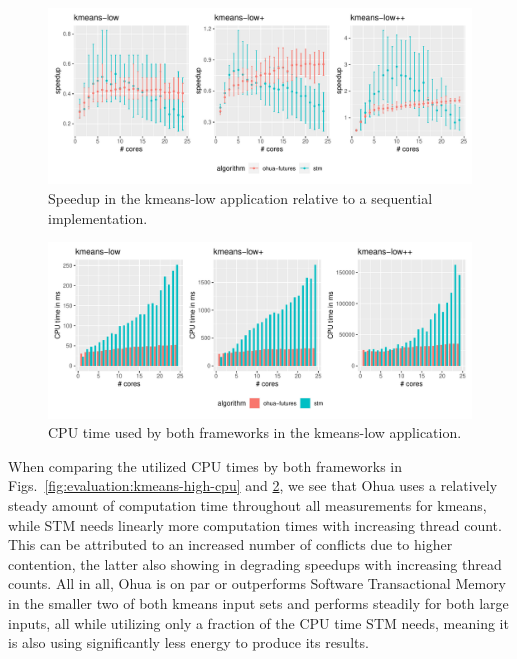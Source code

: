 \begin{figure}
    \centering
    \includegraphics[width=\textwidth,keepaspectratio]{gfx/results/kmeans-low_comb}
    \caption{Speedup in the kmeans-low application relative to a sequential implementation.}%
    \label{fig:evaluation:kmeans-low}
\end{figure}

\begin{figure}
    \centering
    \includegraphics[width=\textwidth,keepaspectratio]{gfx/results/cpu_kmeans-low_comb}
    \caption{CPU time used by both frameworks in the kmeans-low application.}%
    \label{fig:evaluation:kmeans-low-cpu}
\end{figure}

When comparing the utilized CPU times by both frameworks in Figs.~\ref{fig:evaluation:kmeans-high-cpu} and \ref{fig:evaluation:kmeans-low-cpu}, we see that Ohua uses a relatively steady amount of computation time throughout all measurements for kmeans, while STM needs linearly more computation times with increasing thread count.
This can be attributed to an increased number of conflicts due to higher contention, the latter also showing in degrading speedups with increasing thread counts.
All in all, Ohua is on par or outperforms Software Transactional Memory in the smaller two of both kmeans input sets and performs steadily for both large inputs, all while utilizing only a fraction of the CPU time STM needs, meaning it is also using significantly less energy to produce its results.

